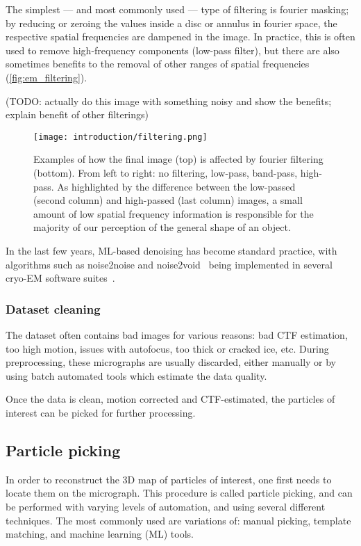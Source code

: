 The simplest --- and most commonly used --- type of filtering is fourier masking; by reducing or zeroing the values inside a disc or annulus in fourier space, the respective spatial frequencies are dampened in the image.
In practice, this is often used to remove high-frequency components (low-pass filter), but there are also sometimes benefits to the removal of other ranges of spatial frequencies (\autoref{fig:em_filtering}).

(TODO: actually do this image with something noisy and show the benefits; explain benefit of other filterings)

\begin{figure}[ht]
    \centering
    \texttt{[image: introduction/filtering.png]}
    \caption[Fourier filtering]{Examples of how the final image (top) is affected by fourier filtering (bottom). From left to right: no filtering, low-pass, band-pass, high-pass. As highlighted by the difference between the low-passed (second column) and high-passed (last column) images, a small amount of low spatial frequency information is responsible for the majority of our perception of the general shape of an object.}
    \label{fig:em_filtering}
\end{figure}

In the last few years, ML-based denoising has become standard practice, with algorithms such as noise2noise and noise2void~\cite{lehtinenNoise2NoiseLearningImage2018,krullNoise2VoidLearningDenoising2019} being implemented in several cryo-EM software suites~\cite{beplerTopazDenoiseGeneralDeep2020,tegunovRealtimeCryoelectronMicroscopy2019,buchholzCryoCAREContentAwareImage2018}.

\subsubsection{Dataset cleaning}
The dataset often contains bad images for various reasons: bad CTF estimation, too high motion, issues with autofocus, too thick or cracked ice, etc.
During preprocessing, these micrographs are usually discarded, either manually or by using batch automated tools which estimate the data quality.

Once the data is clean, motion corrected and CTF-estimated, the particles of interest can be picked for further processing.

\subsection{Particle picking}\label{em_particle_picking}
In order to reconstruct the 3D map of particles of interest, one first needs to locate them on the micrograph.
This procedure is called particle picking, and can be performed with varying levels of automation, and using several different techniques.
The most commonly used are variations of: manual picking, template matching, and machine learning (ML) tools.

